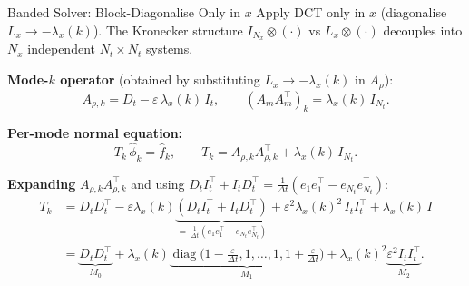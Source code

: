 \documentclass[10pt,aspectratio=169]{beamer}
\newcommand{\eps}{\varepsilon}
\newcommand{\lx}{\lambda_x}
\newcommand{\Dt}{D_t}
\newcommand{\DtT}{D_t^{\!\top}}
\newcommand{\It}{I_t}
\newcommand{\ItT}{I_t^{\!\top}}
\newcommand{\Lx}{L_x}
\newcommand{\kron}{\otimes}
\begin{document}
\begin{frame}{Banded Solver: Block-Diagonalise Only in $x$}
  Apply DCT only in $x$ (diagonalise $\Lx\to-\lx(k)$).
  The Kronecker structure $I_{N_x}\kron(\cdot)$ vs $\Lx\kron(\cdot)$
  decouples into $N_x$ independent $N_t{\times}N_t$ systems.

  \medskip
  \textbf{Mode-$k$ operator} (obtained by substituting $\Lx\to-\lx(k)$ in $A_\rho$):
  \[
    A_{\rho,k} = \Dt - \eps\,\lx(k)\,\It,
    \qquad
    (A_m A_m^\top)_k = \lx(k)\,I_{N_t}.
  \]

  \medskip
  \textbf{Per-mode normal equation:}
  \[
    T_k\,\hat\phi_k = \hat f_k,
    \qquad
    \boxed{T_k = A_{\rho,k}A_{\rho,k}^\top + \lx(k)\,I_{N_t}}.
  \]

  \medskip
  \textbf{Expanding} $A_{\rho,k}A_{\rho,k}^\top$ and using
  $\Dt\ItT + \It\DtT = \frac{1}{\Delta t}(e_1 e_1^\top - e_{N_t}e_{N_t}^\top)$:
  \begin{align*}
    T_k
    &= \Dt\DtT
     - \eps\lx(k)\underbrace{(\Dt\ItT+\It\DtT)}_{=\,\frac{1}{\Delta t}(e_1e_1^\top - e_{N_t}e_{N_t}^\top)}
     + \eps^2\lx(k)^2\,\It\ItT
     + \lx(k)\,I \\[4pt]
    &= \underbrace{\Dt\DtT}_{M_0}
     + \lx(k)\underbrace{\operatorname{diag}\!\bigl(1{-}\tfrac{\eps}{\Delta t},1,\ldots,1,1{+}\tfrac{\eps}{\Delta t}\bigr)}_{M_1}
     + \lx(k)^2\underbrace{\eps^2\It\ItT}_{M_2}.
  \end{align*}
\end{frame}
\end{document}
